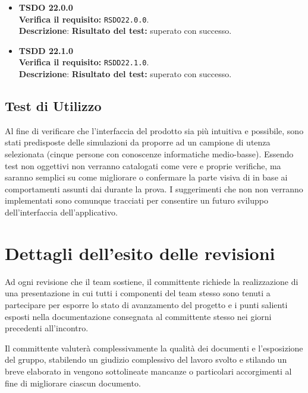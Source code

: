 \begin{itemize}
\item \textbf{TSDO 22.0.0}\\
\textbf{Verifica il requisito:} \texttt{RSDO22.0.0}.\\
\textbf{Descrizione}: %
\textbf{Risultato del test:} superato con successo.

\item \textbf{TSDD 22.1.0}\\
\textbf{Verifica il requisito:} \texttt{RSDD22.1.0}.\\
\textbf{Descrizione}: %
\textbf{Risultato del test:} superato con successo.

\end{itemize}

\subsection{Test di Utilizzo}
Al fine di verificare che l'interfaccia del prodotto sia più intuitiva e  possibile, sono stati predisposte delle simulazioni da proporre ad un campione di utenza selezionata (cinque persone con conoscenze informatiche medio-basse).
Essendo test non oggettivi non verranno catalogati come vere e proprie verifiche, ma saranno semplici  su come migliorare o confermare la parte visiva di \caName in base ai comportamenti assunti dai  durante la prova.
I suggerimenti che non non verranno implementati sono comunque tracciati per consentire un futuro sviluppo dell'interfaccia dell'applicativo.

\clearpage

\section{Dettagli dell'esito delle revisioni}
Ad ogni revisione che il team sostiene, il committente richiede la realizzazione di una presentazione in cui tutti i componenti del team stesso sono tenuti a partecipare per esporre lo stato di avanzamento del progetto e i punti salienti esposti nella documentazione consegnata al committente stesso nei giorni precedenti all'incontro.

Il committente valuterà complessivamente la qualità dei documenti e l'esposizione del gruppo, stabilendo un giudizio complessivo del lavoro svolto e stilando un breve elaborato in vengono sottolineate mancanze o particolari accorgimenti al fine di migliorare ciascun documento.

